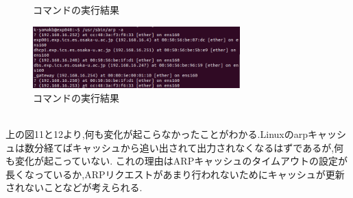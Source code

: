 \documentclass[dvipdfmx]{jarticle}
\begin{document}
\begin{enumerate}
\begin{figure}[h]
        \caption{コマンドの実行結果}
    \end{figure}
    \begin{figure}[h]
        \centering
        \includegraphics[width=8cm]{1-2-9-2.png}
        \caption{コマンドの実行結果}
    \end{figure}
    \\上の図11と12より,何も変化が起こらなかったことがわかる.Linuxのarpキャッシュは数分経てばキャッシュから追い出されて出力されなくなるはずであるが,何も変化が起こっていない.
    これの理由はARPキャッシュのタイムアウトの設定が長くなっているか,ARPリクエストがあまり行われないためにキャッシュが更新されないことなどが考えられる.
\end{enumerate}
\end{document}

